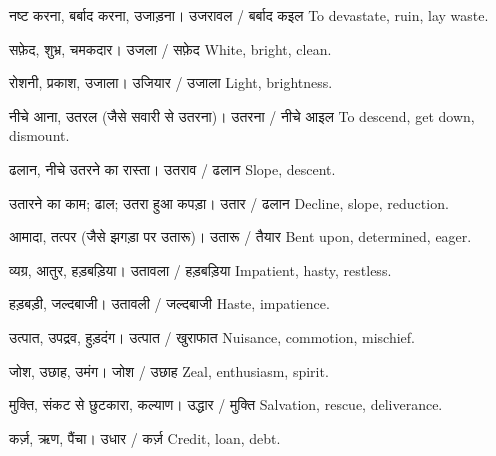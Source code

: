 %
{नष्ट करना, बर्बाद करना, उजाड़ना।}%
{उजरावल / बर्बाद कइल}%
{To devastate, ruin, lay waste.}

%
{सफ़ेद, शुभ्र, चमकदार।}%
{उजला / सफ़ेद}%
{White, bright, clean.}

%
{रोशनी, प्रकाश, उजाला।}%
{उजियार / उजाला}%
{Light, brightness.}

%
{नीचे आना, उतरल (जैसे सवारी से उतरना)।}%
{उतरना / नीचे आइल}%
{To descend, get down, dismount.}

%
{ढलान, नीचे उतरने का रास्ता।}%
{उतराव / ढलान}%
{Slope, descent.}

%
{उतारने का काम; ढाल; उतरा हुआ कपड़ा।}%
{उतार / ढलान}%
{Decline, slope, reduction.}

%
{आमादा, तत्पर (जैसे झगड़ा पर उतारू)।}%
{उतारू / तैयार}%
{Bent upon, determined, eager.}

%
{व्यग्र, आतुर, हड़बड़िया।}%
{उतावला / हड़बड़िया}%
{Impatient, hasty, restless.}

%
{हड़बड़ी, जल्दबाजी।}%
{उतावली / जल्दबाजी}%
{Haste, impatience.}

%
{उत्पात, उपद्रव, हुड़दंग।}%
{उत्पात / खुराफात}%
{Nuisance, commotion, mischief.}

%
{जोश, उछाह, उमंग।}%
{जोश / उछाह}%
{Zeal, enthusiasm, spirit.}

%
{मुक्ति, संकट से छुटकारा, कल्याण।}%
{उद्धार / मुक्ति}%
{Salvation, rescue, deliverance.}

%
{कर्ज़, ऋण, पैंचा।}%
{उधार / कर्ज़}%
{Credit, loan, debt.}

